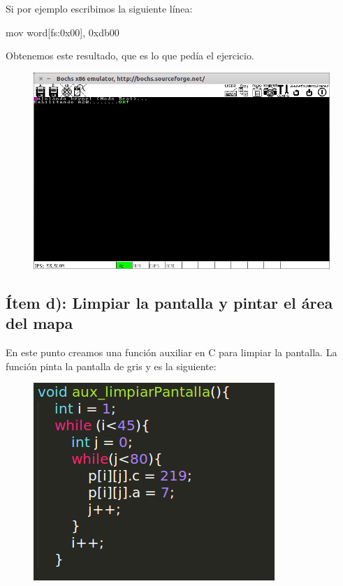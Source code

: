 Si por ejemplo escribimos la siguiente línea:
\begin{center}
mov word[fs:0x00],  0xdb00
\end{center}

Obtenemos este resultado, que es lo que pedía el ejercicio.

\begin{figure}[H]
\begin{center}
  \includegraphics[width=\linewidth]{ejercicio1/esqsupizq.png}
  \caption{{\small}} 
\endminipage
\end{center}
\end{figure}

\subsection{Ítem d): Limpiar la pantalla y pintar el área del mapa}

En este punto creamos una función auxiliar en C para limpiar la pantalla. La función pinta la pantalla de gris y es la siguiente:

\begin{figure}[H]
\begin{center}
  \includegraphics[width=\linewidth]{ejercicio1/limpant.png}
  \caption{{\small}} 
\endminipage
\end{center}
\end{figure}

